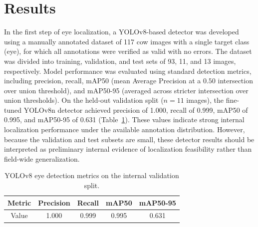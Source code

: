 \documentclass[preprint,12pt,authoryear]{elsarticle}
\begin{document}



\section{Results}
\label{results}
In the first step of eye localization, a YOLOv8-based detector was developed using a manually annotated dataset of 117 cow images with a single target class (eye), for which all annotations were verified as valid with no errors. The dataset was divided into training, validation, and test sets of 93, 11, and 13 images, respectively. Model performance was evaluated using standard detection metrics, including precision, recall, mAP50 (mean Average Precision at a $0.50$ intersection over union threshold), and mAP50-95 (averaged across stricter intersection over union thresholds). On the held-out validation split ($n=11$ images), the fine-tuned YOLOv8n detector achieved precision of 1.000, recall of 0.999, mAP50 of 0.995, and mAP50-95 of 0.631 (Table~\ref{tab:loc}). These values indicate strong internal localization performance under the available annotation distribution. However, because the validation and test subsets are small, these detector results should be interpreted as preliminary internal evidence of localization feasibility rather than field-wide generalization.

\begin{table}
\centering
\caption{YOLOv8 eye detection metrics on the internal validation split.}\label{tab:loc}
\begin{tabular}{c|c|c|c|c}
\hline
Metric & Precision & Recall & mAP50 & mAP50-95 \\
\hline
Value & 1.000 & 0.999 & 0.995 & 0.631\\
\hline
\end{tabular}
\end{table}
\end{document}
